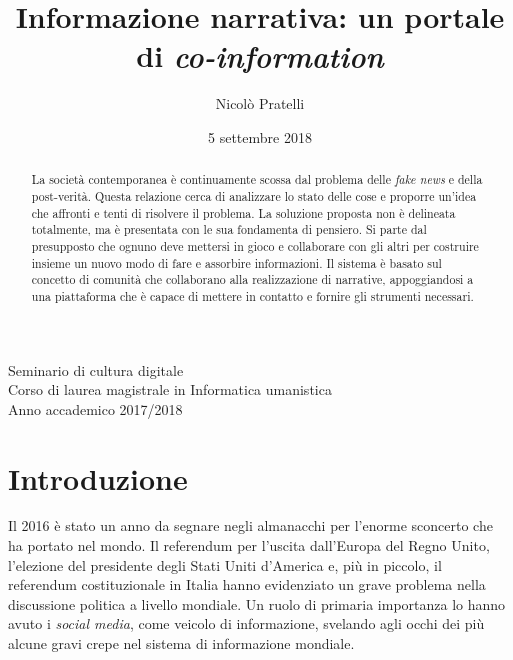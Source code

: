 \documentclass{article}
\begin{document}
\title{\bf Informazione narrativa: un portale di \textit{co-information}}

\author{Nicolò Pratelli}

\date{5 settembre 2018}

\maketitle

\thispagestyle{fancy}

\begin{center}
Seminario di cultura digitale\\
Corso di laurea magistrale in Informatica umanistica\\
Anno accademico 2017/2018

\end{center}

\vspace{1cm}
\begin{abstract}
La società contemporanea è continuamente scossa dal problema delle \textit{fake news} e della post-verità. Questa relazione cerca di analizzare lo stato delle cose e proporre un’idea che affronti e tenti di risolvere il problema. La soluzione proposta non è delineata totalmente, ma è presentata con le sua fondamenta di pensiero. Si parte dal presupposto che ognuno deve mettersi in gioco e collaborare con gli altri per costruire insieme un nuovo modo di fare e assorbire informazioni. Il sistema è basato sul concetto di comunità che collaborano alla realizzazione di narrative, appoggiandosi a una piattaforma che è capace di mettere in contatto e fornire gli strumenti necessari.
\end{abstract}


\newpage

\tableofcontents

\newpage

\section{Introduzione}

 Il 2016 è stato un anno da segnare negli almanacchi per l’enorme sconcerto che ha portato nel mondo. Il referendum per l’uscita dall’Europa del Regno Unito, l’elezione del presidente degli Stati Uniti d’America e, più in piccolo, il referendum costituzionale in Italia hanno evidenziato un grave problema nella discussione politica a livello mondiale. Un ruolo di primaria importanza lo hanno avuto i \textit{social media}, come veicolo di informazione, svelando agli occhi dei più alcune gravi crepe nel sistema di informazione mondiale.
 
\end{document}
